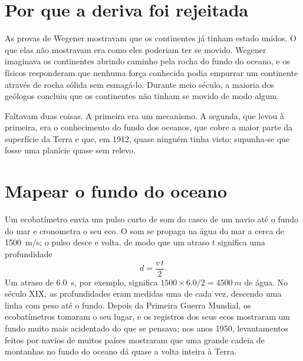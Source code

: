 \section{Por que a deriva foi rejeitada}

As provas de Wegener mostravam que os continentes já tinham estado unidos. O
que elas não mostravam era como eles poderiam ter se movido. Wegener
imaginava os continentes abrindo caminho pela rocha do fundo do oceano, e os
físicos responderam que nenhuma força conhecida podia empurrar um continente
através de rocha sólida sem esmagá-lo. Durante meio século, a maioria dos
geólogos concluiu que os continentes não tinham se movido de modo algum.

Faltavam duas coisas. A primeira era um mecanismo. A segunda, que levou à
primeira, era o conhecimento do fundo dos oceanos, que cobre a maior parte
da superfície da Terra e que, em 1912, quase ninguém tinha visto: supunha-se
que fosse uma planície quase sem relevo.

\section{Mapear o fundo do oceano}

Um ecobatímetro envia um pulso curto de som do casco de um navio até o fundo
do mar e cronometra o seu eco. O som se propaga na água do mar a cerca de
\qty{1500}{m/s}; o pulso desce e volta, de modo que um atraso $t$ significa
uma profundidade
\[
  d = \frac{v\,t}{2}.
\]
Um atraso de \qty{6.0}{s}, por exemplo, significa $1500 \times 6.0/2 =
\qty{4500}{m}$ de água. No século XIX, as profundidades eram medidas uma de
cada vez, descendo uma linha com peso até o fundo. Depois da Primeira Guerra
Mundial, os ecobatímetros tomaram o seu lugar, e os registros dos seus ecos
mostraram um fundo muito mais acidentado do que se pensava; nos anos 1950,
levantamentos feitos por navios de muitos países mostraram que uma grande
cadeia de montanhas no fundo do oceano dá quase a volta inteira à Terra.

